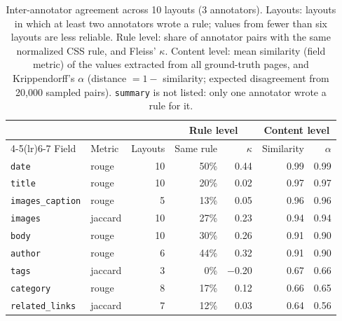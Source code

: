 \begin{table}[!htb]
  \centering
  \small
  \caption{Inter-annotator agreement across 10 layouts (3 annotators). Layouts: layouts in which at least two annotators wrote a rule; values from fewer than six layouts are less reliable. Rule level: share of annotator pairs with the same normalized CSS rule, and Fleiss' $\kappa$. Content level: mean similarity (field metric) of the values extracted from all ground-truth pages, and Krippendorff's $\alpha$ (distance $= 1 -$ similarity; expected disagreement from 20{,}000 sampled pairs). \texttt{summary} is not listed: only one annotator wrote a rule for it.}
  \label{tab:agreement}
  \begin{tabular}{llrrrrr}
    \toprule
          &        &         & \multicolumn{2}{c}{Rule level} & \multicolumn{2}{c}{Content level} \\
    \cmidrule(lr){4-5}\cmidrule(lr){6-7}
    Field & Metric & Layouts & Same rule & $\kappa$ & Similarity & $\alpha$ \\
    \midrule
    \texttt{date} & rouge & 10 & 50\% & 0.44 & 0.99 & 0.99 \\
    \texttt{title} & rouge & 10 & 20\% & 0.02 & 0.97 & 0.97 \\
    \texttt{images\_caption} & rouge & 5 & 13\% & 0.05 & 0.96 & 0.96 \\
    \texttt{images} & jaccard & 10 & 27\% & 0.23 & 0.94 & 0.94 \\
    \texttt{body} & rouge & 10 & 30\% & 0.26 & 0.91 & 0.90 \\
    \texttt{author} & rouge & 6 & 44\% & 0.32 & 0.91 & 0.90 \\
    \texttt{tags} & jaccard & 3 & 0\% & $-$0.20 & 0.67 & 0.66 \\
    \texttt{category} & rouge & 8 & 17\% & 0.12 & 0.66 & 0.65 \\
    \texttt{related\_links} & jaccard & 7 & 12\% & 0.03 & 0.64 & 0.56 \\
    \bottomrule
  \end{tabular}
\end{table}
